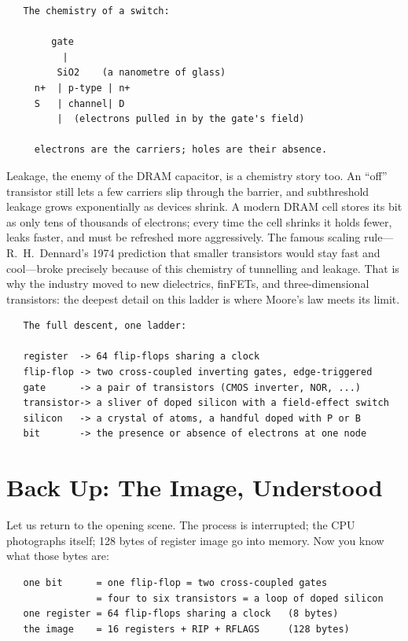 \begin{verbatim}
   The chemistry of a switch:

        gate
          |
         SiO2    (a nanometre of glass)
     n+  | p-type | n+
     S   | channel| D
         |  (electrons pulled in by the gate's field)

     electrons are the carriers; holes are their absence.
\end{verbatim}

Leakage, the enemy of the DRAM capacitor, is a chemistry story too.
An ``off'' transistor still lets a few carriers slip through the
barrier, and subthreshold leakage grows exponentially as devices
shrink. A modern DRAM cell stores its bit as only tens of thousands
of electrons; every time the cell shrinks it holds fewer, leaks
faster, and must be refreshed more aggressively. The famous scaling
rule---R.~H.~Dennard's 1974 prediction that smaller transistors would
stay fast and cool---broke precisely because of this chemistry of
tunnelling and leakage. That is why the industry moved to new
dielectrics, finFETs, and three-dimensional transistors: the deepest
detail on this ladder is where Moore's law meets its limit.

\begin{verbatim}
   The full descent, one ladder:

   register  -> 64 flip-flops sharing a clock
   flip-flop -> two cross-coupled inverting gates, edge-triggered
   gate      -> a pair of transistors (CMOS inverter, NOR, ...)
   transistor-> a sliver of doped silicon with a field-effect switch
   silicon   -> a crystal of atoms, a handful doped with P or B
   bit       -> the presence or absence of electrons at one node
\end{verbatim}

\section{Back Up: The Image, Understood}
\label{sec:backup}

Let us return to the opening scene. The process is interrupted; the
CPU photographs itself; 128 bytes of register image go into memory.
Now you know what those bytes are:

\begin{verbatim}
   one bit      = one flip-flop = two cross-coupled gates
                = four to six transistors = a loop of doped silicon
   one register = 64 flip-flops sharing a clock   (8 bytes)
   the image    = 16 registers + RIP + RFLAGS     (128 bytes)
\end{verbatim}


